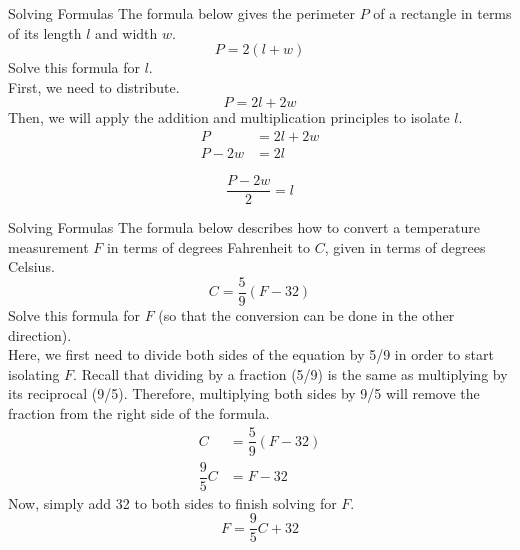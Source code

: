 \begin{example}{Solving Formulas}
The formula below gives the perimeter $P$ of a rectangle in terms of its length $l$ and width $w$.
\[P = 2(l+w)\]
Solve this formula for $l$.\\

\sol
First, we need to distribute.
\[P = 2l + 2w\]
Then, we will apply the addition and multiplication principles to isolate $l$.
\begin{align*}
P &= 2l + 2w\\
P - 2w &= 2l
\end{align*}

\[\boxed{\dfrac{P-2w}{2} = l}\]
\end{example}

\begin{example}{Solving Formulas}
The formula below describes how to convert a temperature measurement $F$ in terms of degrees Fahrenheit to $C$, given in terms of degrees Celsius.
\[C = \dfrac{5}{9}(F-32)\]
Solve this formula for $F$ (so that the conversion can be done in the other direction).\\

\sol
Here, we first need to divide both sides of the equation by 5/9 in order to start isolating $F$.  Recall that dividing by a fraction (5/9) is the same as multiplying by its reciprocal (9/5).  Therefore, multiplying both sides by 9/5 will remove the fraction from the right side of the formula.
\begin{align*}
C &= \dfrac{5}{9}(F-32)\\
\dfrac{9}{5}C &= F-32
\end{align*}
Now, simply add 32 to both sides to finish solving for $F$.
\[\boxed{F = \dfrac{9}{5}C + 32}\]
\end{example}

